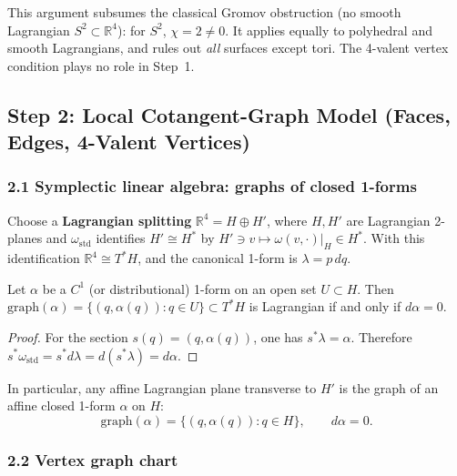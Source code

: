 \begin{remark}\label{rem:q8-gromov-subsumed}
This argument subsumes the classical Gromov obstruction
(no smooth Lagrangian $S^2\subset\mathbb R^4$): for $S^2$, $\chi=2\ne0$.
It applies equally to polyhedral and smooth Lagrangians, and rules out \emph{all}
surfaces except tori.  The 4-valent vertex condition plays no role in Step~1.
\end{remark}


\subsection*{Step 2: Local Cotangent-Graph Model (Faces, Edges, 4-Valent Vertices)}

\subsubsection*{2.1 Symplectic linear algebra: graphs of closed 1-forms}
Choose a \textbf{Lagrangian splitting}
$\mathbb R^4 = H \oplus H'$,
where $H,H'$ are Lagrangian 2-planes and $\omega_{\mathrm{std}}$ identifies $H'\cong H^*$ by
$H'\ni v\mapsto \omega(v,\cdot)|_H\in H^*$.
With this identification $\mathbb R^4\cong T^*H$, and the canonical 1-form is
$\lambda=p\,dq$.

\begin{lemma}\label{lem:q8-graph-criterion}
Let $\alpha$ be a $C^1$ (or distributional) 1-form on an open set $U\subset H$.
Then $\mathrm{graph}(\alpha)=\{(q,\alpha(q)):q\in U\}\subset T^*H$
is Lagrangian if and only if $d\alpha=0$.
\end{lemma}
\begin{proof}
For the section $s(q)=(q,\alpha(q))$, one has $s^*\lambda=\alpha$.
Therefore $s^*\omega_{\mathrm{std}}=s^*d\lambda=d(s^*\lambda)=d\alpha$.
\end{proof}

In particular, any affine Lagrangian plane transverse to $H'$ is the graph of an affine
closed 1-form $\alpha$ on $H$:
\[
\mathrm{graph}(\alpha)=\{(q,\alpha(q)):q\in H\},
\qquad d\alpha=0.
\]


\subsubsection*{2.2 Vertex graph chart}

